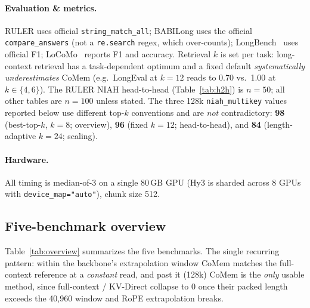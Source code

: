 \paragraph{Evaluation \& metrics.} RULER uses official
\texttt{string\_match\_all}; BABILong uses the official
\texttt{compare\_answers} (not a \texttt{re.search} regex, which over-counts);
LongBench~\citep{longbench} uses official F1; LoCoMo~\citep{locomo} reports F1 and accuracy. Retrieval $k$ is set
per task: long-context retrieval has a task-dependent optimum and a fixed
default \emph{systematically underestimates} CoMem (e.g.\ LongEval at $k{=}12$
reads to 0.70 vs.\ 1.00 at $k{\in}\{4,6\}$). The RULER NIAH head-to-head
(Table~\ref{tab:h2h}) is $n{=}50$; all other tables are $n{=}100$ unless stated.
The three 128k \texttt{niah\_multikey} values reported below use different top-$k$
conventions and are \emph{not} contradictory: \textbf{98} (best-top-$k$, $k{=}8$;
overview), \textbf{96} (fixed $k{=}12$; head-to-head), and \textbf{84}
(length-adaptive $k{=}24$; scaling).

\paragraph{Hardware.} All timing is median-of-3 on a single 80\,GB GPU (Hy3 is
sharded across 8 GPUs with \texttt{device\_map="auto"}), chunk size 512.

\subsection{Five-benchmark overview}
Table~\ref{tab:overview} summarizes the five benchmarks. The single recurring
pattern: within the backbone's extrapolation window CoMem matches the
full-context reference at a \emph{constant} read, and past it (128k) CoMem is
the \emph{only} usable method, since full-context / KV-Direct collapse to 0
once their packed length exceeds the 40{,}960 window and RoPE extrapolation
breaks.



